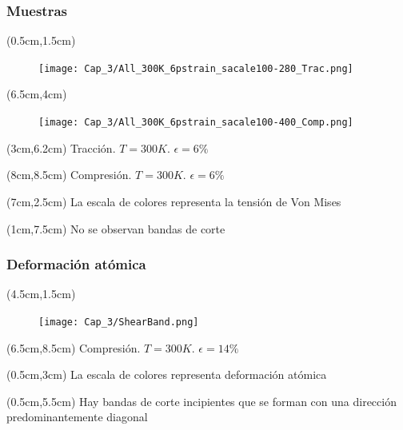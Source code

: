 \begin{frame}
  \frametitle{Muestras}
  \begin{textblock*}{6cm}(0.5cm,1.5cm)
    \begin{figure}[htp]
      \centering
      \texttt{[image: Cap\_3/All\_300K\_6pstrain\_sacale100-280\_Trac.png]}
    \end{figure}
  \end{textblock*}
  \begin{textblock*}{6cm}(6.5cm,4cm)
    \begin{figure}[htp]
      \centering
      \texttt{[image: Cap\_3/All\_300K\_6pstrain\_sacale100-400\_Comp.png]}
    \end{figure}
  \end{textblock*}
  \begin{textblock*}{4cm}(3cm,6.2cm)
   \scriptsize{Tracci\'on. $T=300K$. $\epsilon=6\%$}
  \end{textblock*}
  \begin{textblock*}{5cm}(8cm,8.5cm)
   \scriptsize{Compresi\'on. $T=300K$. $\epsilon=6\%$}
  \end{textblock*}
  \begin{textblock*}{5cm}(7cm,2.5cm)
   \centering
   La escala de colores representa la tensi\'on de Von Mises
  \end{textblock*}
  \begin{textblock*}{5cm}(1cm,7.5cm)
   \centering
   No se observan bandas de corte
  \end{textblock*}
\end{frame}

\begin{frame}
  \frametitle{Deformaci\'on at\'omica}
  \begin{textblock*}{4cm}(4.5cm,1.5cm)
    \begin{figure}[htp]
      \centering
      \texttt{[image: Cap\_3/ShearBand.png]}
    \end{figure}
  \end{textblock*}
  \begin{textblock*}{5cm}(6.5cm,8.5cm)
   \scriptsize{Compresi\'on. $T=300K$. $\epsilon=14\%$}
  \end{textblock*}
  \begin{textblock*}{5cm}(0.5cm,3cm)
   \centering
   La escala de colores representa deformaci\'on at\'omica
  \end{textblock*}
  \begin{textblock*}{5cm}(0.5cm,5.5cm)
   \centering
   Hay bandas de corte incipientes que se forman con una direcci\'on predominantemente diagonal
  \end{textblock*}
  
\end{frame}


